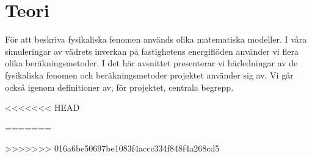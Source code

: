 \section{Teori}

För att beskriva fysikaliska fenomen används olika matematiska modeller. I våra simuleringar av vädrets inverkan på fastighetens energiflöden använder vi flera olika beräkningsmetoder. I det här avsnittet presenterar vi härledningar av de fysikaliska fenomen och beräkningsmetoder projektet använder sig av. Vi går också igenom definitioner av, för projektet, centrala begrepp.












<<<<<<< HEAD

=======

>>>>>>> 016a6be50697be1083f4accc334f848f4a268cd5

